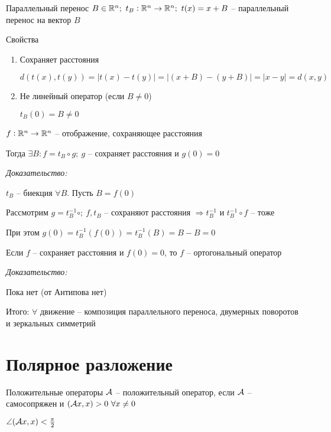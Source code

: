 \documentclass[12pt]{article}
\begin{document}
\begin{defin}{Параллельный перенос}
    $B \in \mathbb R^n;\ t_B : \mathbb R^n \to \mathbb R^n;\ t(x) = x + B$ -- параллельный перенос на вектор $B$
\end{defin}

\begin{theo}{Свойства}
    \begin{enumerate}
        \item Сохраняет расстояния 
        
        $d(t(x), t(y)) = |t(x) - t(y)| = |(x + B) - (y + B)| = |x - y| = d(x, y)$

        \item Не линейный оператор (если $B \neq 0$)
        
        $t_B(0) = B \neq 0$ 
    \end{enumerate}
\end{theo}

\begin{lem}{}
    $f : \mathbb R^n \to \mathbb R^n$ -- отображение, сохраняющее расстояния 

    Тогда $\exists B : f = t_B \circ g;\ g$ -- сохраняет расстояния и $g(0) = 0$
\end{lem}

\textit{Доказательство:}

$t_B$ -- биекция $\forall B$. Пусть $B = f(0)$

Рассмотрим $g = t^{-1}_B \circ ;\ f, t_B$ -- сохраняют расстояния $\Rightarrow t_B^{-1}$ и $t_B^{-1} \circ f$ -- тоже

При этом $g(0) = t^{-1}_B(f(0)) = t^{-1}_B(B) = B - B = 0$

\begin{theo}{}
    Если $f$ -- сохраняет расстояния и $f(0) = 0$, то $f$ -- ортогональный оператор
\end{theo}

\textit{Доказательство:}

Пока нет (от Антипова нет) \todo

\begin{nota}{}
    Итого: $\forall$ движение -- композиция параллельного переноса, двумерных поворотов и зеркальных симметрий 
\end{nota}

\section{Полярное разложение}

\begin{defin}{Положительные операторы}
    $\mathcal{A}$ -- положительный оператор, если $\mathcal{A}$ -- самосопряжен и $(\mathcal{A} x, x) > 0\ \forall x \neq 0$

    $\angle(\mathcal{A} x, x) < \frac{\pi}{2}$
\end{defin}
\end{document}
